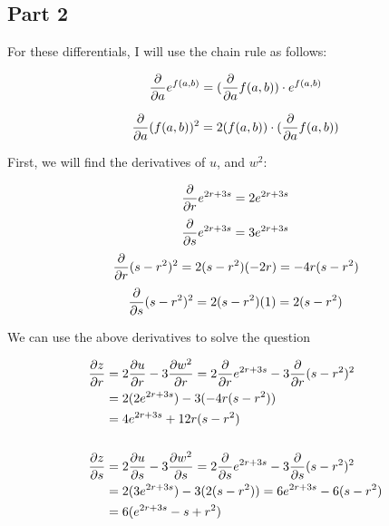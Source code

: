 \documentclass[12pt]{article} %
\begin{document}
\begin{homeworkProblem}
    \subsection*{Part 2}

    For these differentials, I will use the chain rule as follows:

    $$\frac{\partial}{\partial a} e^{f(a, b)} = (\frac{\partial}{\partial a} f(a, b)) \cdot e^{f(a, b)}$$

    $$\frac{\partial}{\partial a} (f(a, b))^2 = 2(f(a, b)) \cdot (\frac{\partial}{\partial a} f(a, b))$$


    First, we will find the derivatives of $u$, and $w^2$:


    $$\frac{\partial}{\partial r} e^{2r + 3s} = 2e^{2r + 3s}$$
    $$\frac{\partial}{\partial s} e^{2r + 3s} = 3e^{2r + 3s}$$
    $$\frac{\partial}{\partial r} (s - r^2)^2 = 2(s - r^2) (-2r) = -4r(s - r^2)$$
    $$\frac{\partial}{\partial s} (s - r^2)^2 = 2(s - r^2) (1) = 2(s - r^2)$$

    We can use the above derivatives to solve the question

    \begin{align*}
        \frac{\partial z}{\partial r} & = 2 \frac{\partial u}{\partial r} - 3 \frac{\partial w^2}{\partial r} = 2 \frac{\partial}{\partial r} e^{2r + 3s} - 3 \frac{\partial}{\partial r} (s - r^2)^2  \\
                      & = 2 (2e^{2r + 3s}) - 3 (-4r(s - r^2))                                                            \\
                      & = 4e^{2r + 3s} + 12 r (s - r^2)                                                                  \\ \\
        \frac{\partial z}{\partial s} & = 2 \frac{\partial u}{\partial s} - 3 \frac{\partial w^2}{\partial s}  = 2 \frac{\partial}{\partial s} e^{2r + 3s} - 3 \frac{\partial}{\partial s} (s - r^2)^2 \\
                      & = 2 (3e^{2r + 3s}) - 3 (2(s - r^2)) = 6e^{2r + 3s} - 6(s - r^2)                                  \\
                      & = 6 (e^{2r + 3s} - s + r^2)
    \end{align*}

\end{homeworkProblem}
\pagebreak
\end{document}
